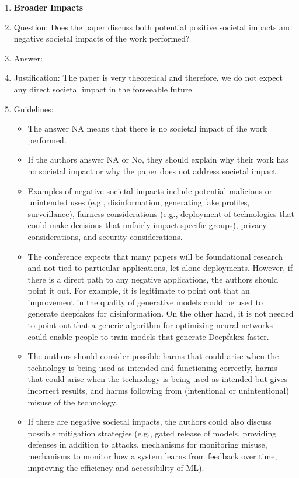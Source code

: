\documentclass{article} %
\newcounter{ct}
\theoremstyle{definition}
\theoremstyle{remark}
\begin{document}
\begin{enumerate}
\item {\bf Broader Impacts}
    \item[] Question: Does the paper discuss both potential positive societal impacts and negative societal impacts of the work performed?
    \item[] Answer: \answerNA{} %
    \item[] Justification: The paper is very theoretical and therefore, we do not expect any direct societal impact in the forseeable future.
    \item[] Guidelines:
    \begin{itemize}
        \item The answer NA means that there is no societal impact of the work performed.
        \item If the authors answer NA or No, they should explain why their work has no societal impact or why the paper does not address societal impact.
        \item Examples of negative societal impacts include potential malicious or unintended uses (e.g., disinformation, generating fake profiles, surveillance), fairness considerations (e.g., deployment of technologies that could make decisions that unfairly impact specific groups), privacy considerations, and security considerations.
        \item The conference expects that many papers will be foundational research and not tied to particular applications, let alone deployments. However, if there is a direct path to any negative applications, the authors should point it out. For example, it is legitimate to point out that an improvement in the quality of generative models could be used to generate deepfakes for disinformation. On the other hand, it is not needed to point out that a generic algorithm for optimizing neural networks could enable people to train models that generate Deepfakes faster.
        \item The authors should consider possible harms that could arise when the technology is being used as intended and functioning correctly, harms that could arise when the technology is being used as intended but gives incorrect results, and harms following from (intentional or unintentional) misuse of the technology.
        \item If there are negative societal impacts, the authors could also discuss possible mitigation strategies (e.g., gated release of models, providing defenses in addition to attacks, mechanisms for monitoring misuse, mechanisms to monitor how a system learns from feedback over time, improving the efficiency and accessibility of ML).
    \end{itemize}
    

\end{enumerate}
\end{document}
